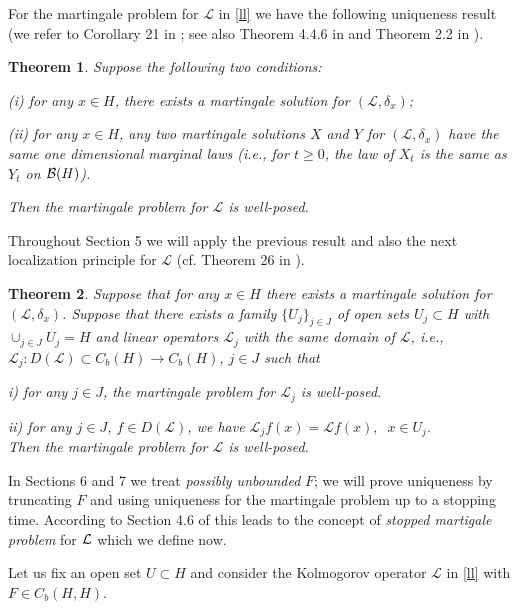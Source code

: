 \documentclass[preprint]{imsart}
\newtheorem{theorem}{Theorem}
\def\L{\mathcal L}
\begin{document}
For the martingale problem for $\L$ in \eqref{ll}  we have  the following  uniqueness  result (we refer to   Corollary 21 in \cite{PrPot}; see also Theorem 4.4.6 in \cite{EK} and Theorem 2.2 in \cite{kunze}).
  


\begin{theorem} \label{ria} 
  Suppose the following two conditions:

 (i)  for any $x \in H$, there exists a  martingale
solution
  for $(\L, \delta_x)$;

 (ii)  for any $x \in H$, any two  martingale solutions $X$ and $Y$ for $(\L, \delta_x)$ have the same one dimensional marginal laws (i.e., for    $t \ge 0$, the law of $X_t$ is the same as $Y_t$ on ${\cal B}(H)$).   

 Then the
   martingale
   problem for  $\L$ is well-posed. 
\end{theorem}
Throughout  Section 5 we will apply the previous result and also the next localization principle for $\L$ (cf.  Theorem 26 in \cite{PrPot}). 
\begin{theorem} \label{uni1}  Suppose   
    that for any $x \in
H$ there exists a martingale solution  for  $(\L, \delta_x)$.
   Suppose that
 there exists
a family $\{ U_j\}_{j \in J}$ of open sets $U_j \subset H$  with $\cup_{j \in J} U_j = H$  and  linear operators $\L_j$ with the same domain of $\L$, i.e., 
 $ \L_j: D(\L) \subset C_b (H) \to C_b(H)$, $j \in J $ such that


i)  for any $j \in J$, the martingale problem for $\L_j$ is well-posed.

ii) for any $j \in J$, $f \in D(\L)$, we have
$
 \L_j  f(x) = \L  f(x),\;\; x \in U_j.
$
\\ 
Then the martingale problem for $\L$ is well-posed.  
  \end{theorem}
  
 In {  Sections 6 and 7}  we   treat {\sl possibly unbounded} $F$; we will prove uniqueness 
by truncating $F$ 
 and using uniqueness  for the martingale problem up to a stopping time.   According to  Section 4.6 of \cite{EK} this leads to the  concept of {\sl stopped martigale problem} for  $\cal L$ which we define now.  
  
\smallskip   
Let us fix an open set $U \subset H$ and consider the Kolmogorov operator $\L$ in \eqref{ll} with $F \in C_b (H,H)$. 
\end{document}
